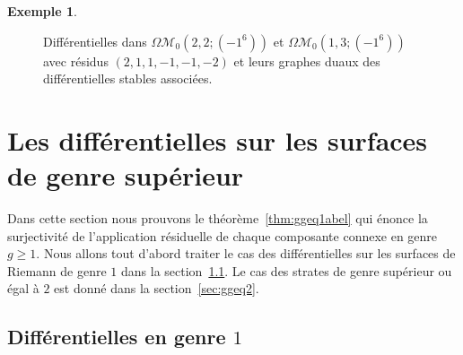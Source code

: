 \documentclass[JEP,XML,SOM,Unicode,francais,NoFloatCountersInSection,published]{cedram}
\let\mathcal\mathscr
\newcommand{\omoduli}[1][g]{{\Omega\mathcal M}_{\!#1}}
\theoremstyle{definition}
\newtheorem{ex}[thm]{Exemple}
\begin{document}
\begin{ex}
\begin{figure}[htb]
\caption{Différentielles dans $\omoduli[0](2,2;(-1^6))$ et $\omoduli[0](1,3;(-1^6))$ avec résidus $(2,1,1,-1,-1,-2)$ et leurs graphes duaux des différentielles stables associées.} \label{fig:graphdeliant}
\end{figure}

\end{ex}

\section{Les différentielles sur les surfaces de genre supérieur}
\label{sec:ggeq1}

Dans cette section nous prouvons le théorème~\ref{thm:ggeq1abel} qui énonce la surjectivité de l'application résiduelle de chaque composante connexe en genre $g\geq1$.
Nous allons tout d'abord traiter le cas des différentielles sur les surfaces de Riemann de genre $1$ dans la section~\ref{sec:g1}. Le cas des strates de genre supérieur ou égal à $2$ est donné dans la section~\ref{sec:ggeq2}.

\subsection{Différentielles en genre $1$}
\label{sec:g1}
\end{document}

